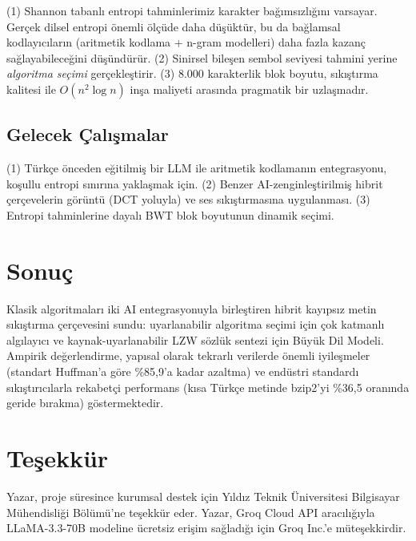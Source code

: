 \documentclass[conference]{IEEEtran}
\begin{document}
(1) Shannon tabanlı entropi tahminlerimiz karakter bağımsızlığını varsayar. Gerçek dilsel entropi önemli ölçüde daha düşüktür, bu da bağlamsal kodlayıcıların (aritmetik kodlama + n-gram modelleri) daha fazla kazanç sağlayabileceğini düşündürür. (2) Sinirsel bileşen sembol seviyesi tahmini yerine \emph{algoritma seçimi} gerçekleştirir. (3) 8.000 karakterlik blok boyutu, sıkıştırma kalitesi ile \(O(n^2 \log n)\) inşa maliyeti arasında pragmatik bir uzlaşmadır.

\subsection{Gelecek Çalışmalar}

(1) Türkçe önceden eğitilmiş bir LLM ile aritmetik kodlamanın entegrasyonu, koşullu entropi sınırına yaklaşmak için. (2) Benzer AI-zenginleştirilmiş hibrit çerçevelerin görüntü (DCT yoluyla) ve ses sıkıştırmasına uygulanması. (3) Entropi tahminlerine dayalı BWT blok boyutunun dinamik seçimi.

\section{Sonuç}

Klasik algoritmaları iki AI entegrasyonuyla birleştiren hibrit kayıpsız metin sıkıştırma çerçevesini sundu: uyarlanabilir algoritma seçimi için çok katmanlı algılayıcı ve kaynak-uyarlanabilir LZW sözlük sentezi için Büyük Dil Modeli. Ampirik değerlendirme, yapısal olarak tekrarlı verilerde önemli iyileşmeler (standart Huffman'a göre \%85,9'a kadar azaltma) ve endüstri standardı sıkıştırıcılarla rekabetçi performans (kısa Türkçe metinde bzip2'yi \%36,5 oranında geride bırakma) göstermektedir.

\section*{Teşekkür}

Yazar, proje süresince kurumsal destek için Yıldız Teknik Üniversitesi Bilgisayar Mühendisliği Bölümü'ne teşekkür eder. Yazar, Groq Cloud API aracılığıyla LLaMA-3.3-70B modeline ücretsiz erişim sağladığı için Groq Inc.'e müteşekkirdir.
\end{document}
